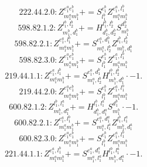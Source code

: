 \documentclass[letterpaper,10pt,fleqn,leqno,onecolumn]{article}
\begin{document}
\begin{equation} \;\;\;\;\;\;  222.44.2.0: Z^{e_{1}^{a}e_{1}^{b}}_{m_{1}^{a}m_{1}^{b}}+=S^{e_{1}^{b}}_{l_{1}^{b}}Z^{e_{1}^{a},l_{1}^{b}}_{m_{1}^{a}m_{1}^{b}} \end{equation}
\begin{equation} \;\;\;\;\;\;  598.82.1.2: Z^{l_{1}^{b},l_{2}^{b}}_{m_{1}^{b},d_{1}^{b}}+=H^{l_{1}^{b},l_{2}^{b}}_{d_{1}^{b},d_{2}^{b}}S^{d_{2}^{b}}_{m_{1}^{b}} \end{equation}
\begin{equation} \;\;\;\;\;\;  598.82.2.1: Z^{e_{1}^{a},l_{1}^{b}}_{m_{1}^{a}m_{1}^{b}}+=S^{e_{1}^{a},d_{1}^{b}}_{m_{1}^{a},l_{2}^{b}}Z^{l_{1}^{b},l_{2}^{b}}_{m_{1}^{b},d_{1}^{b}} \end{equation}
\begin{equation} \;\;\;\;\;\;  598.82.3.0: Z^{e_{1}^{a}e_{1}^{b}}_{m_{1}^{a}m_{1}^{b}}+=S^{e_{1}^{b}}_{l_{1}^{b}}Z^{e_{1}^{a},l_{1}^{b}}_{m_{1}^{a}m_{1}^{b}} \end{equation}
\begin{equation} \;\;\;\;\;\;  219.44.1.1: Z^{e_{1}^{a},l_{1}^{b}}_{m_{1}^{a}m_{1}^{b}}+=S^{e_{1}^{a},d_{1}^{b}}_{m_{1}^{a},l_{2}^{b}}H^{l_{1}^{b},l_{2}^{b}}_{m_{1}^{b},d_{1}^{b}}\cdot -1. \end{equation}
\begin{equation} \;\;\;\;\;\;  219.44.2.0: Z^{e_{1}^{a}e_{1}^{b}}_{m_{1}^{a}m_{1}^{b}}+=S^{e_{1}^{b}}_{l_{1}^{b}}Z^{e_{1}^{a},l_{1}^{b}}_{m_{1}^{a}m_{1}^{b}} \end{equation}
\begin{equation} \;\;\;\;\;\;  600.82.1.2: Z^{l_{1}^{b},l_{1}^{a}}_{m_{1}^{b},d_{1}^{a}}+=H^{l_{1}^{b},l_{1}^{a}}_{d_{1}^{b},d_{1}^{a}}S^{d_{1}^{b}}_{m_{1}^{b}}\cdot -1. \end{equation}
\begin{equation} \;\;\;\;\;\;  600.82.2.1: Z^{e_{1}^{a},l_{1}^{b}}_{m_{1}^{a}m_{1}^{b}}+=S^{e_{1}^{a},d_{1}^{a}}_{m_{1}^{a},l_{1}^{a}}Z^{l_{1}^{b},l_{1}^{a}}_{m_{1}^{b},d_{1}^{a}} \end{equation}
\begin{equation} \;\;\;\;\;\;  600.82.3.0: Z^{e_{1}^{a}e_{1}^{b}}_{m_{1}^{a}m_{1}^{b}}+=S^{e_{1}^{b}}_{l_{1}^{b}}Z^{e_{1}^{a},l_{1}^{b}}_{m_{1}^{a}m_{1}^{b}} \end{equation}
\begin{equation} \;\;\;\;\;\;  221.44.1.1: Z^{e_{1}^{a},l_{1}^{b}}_{m_{1}^{a}m_{1}^{b}}+=S^{e_{1}^{a},d_{1}^{a}}_{m_{1}^{a},l_{1}^{a}}H^{l_{1}^{b},l_{1}^{a}}_{m_{1}^{b},d_{1}^{a}}\cdot -1. \end{equation}
\end{document}
